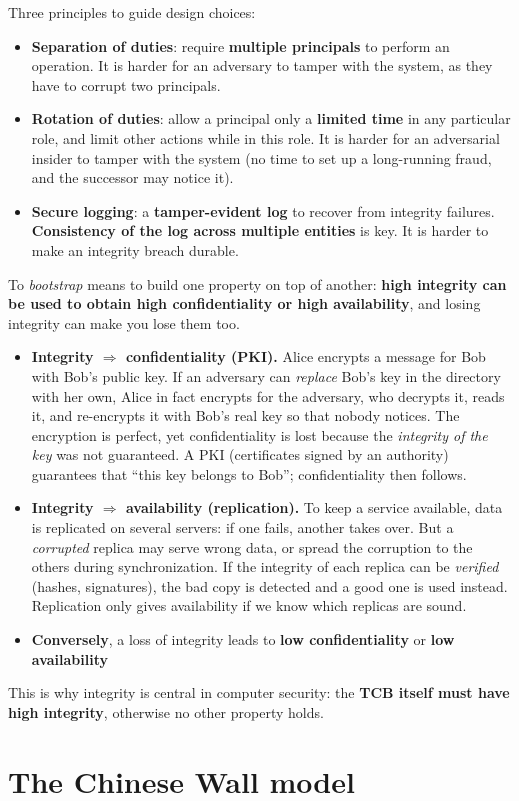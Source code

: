 Three principles to guide design choices:
\begin{itemize}
    \item \textbf{Separation of duties}: require \textbf{multiple principals} to perform an operation. It is harder for an adversary to tamper with the system, as they have to corrupt two principals.
    \item \textbf{Rotation of duties}: allow a principal only a \textbf{limited time} in any particular role, and limit other actions while in this role. It is harder for an adversarial insider to tamper with the system (no time to set up a long-running fraud, and the successor may notice it).
    \item \textbf{Secure logging}: a \textbf{tamper-evident log} to recover from integrity failures. \textbf{Consistency of the log across multiple entities} is key. It is harder to make an integrity breach durable.
\end{itemize}

\begin{remark}
To \emph{bootstrap} means to build one property on top of another: \textbf{high integrity can be used to obtain high confidentiality or high availability}, and losing integrity can make you lose them too.
\begin{itemize}
    \item \textbf{Integrity $\Rightarrow$ confidentiality (PKI).} Alice encrypts a message for Bob with Bob's public key. If an adversary can \emph{replace} Bob's key in the directory with her own, Alice in fact encrypts for the adversary, who decrypts it, reads it, and re-encrypts it with Bob's real key so that nobody notices. The encryption is perfect, yet confidentiality is lost because the \emph{integrity of the key} was not guaranteed. A PKI (certificates signed by an authority) guarantees that ``this key belongs to Bob''; confidentiality then follows.
    \item \textbf{Integrity $\Rightarrow$ availability (replication).} To keep a service available, data is replicated on several servers: if one fails, another takes over. But a \emph{corrupted} replica may serve wrong data, or spread the corruption to the others during synchronization. If the integrity of each replica can be \emph{verified} (hashes, signatures), the bad copy is detected and a good one is used instead. Replication only gives availability if we know which replicas are sound.
    \item \textbf{Conversely}, a loss of integrity leads to \textbf{low confidentiality} or \textbf{low availability}
\end{itemize}
This is why integrity is central in computer security: the \textbf{TCB itself must have high integrity}, otherwise no other property holds.
\end{remark}\section{The Chinese Wall model}

